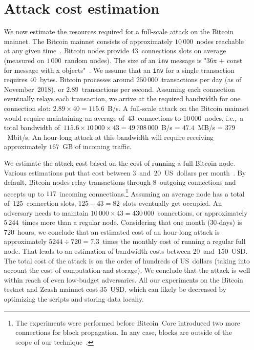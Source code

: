 \section{Attack cost estimation}

We now estimate the resources required for a full-scale attack on the Bitcoin mainnet.
The Bitcoin mainnet consists of approximately $10\,000$~nodes reachable at any given time~\cite{Bitnodes}.
Bitcoin nodes provide $43$~connections slots on average (measured on $1\,000$~random nodes).
The size of an \texttt{inv} message is "36x + const for message with x objects"~\cite{BitcoinWiki}.
We assume that an \texttt{inv} for a single transaction requires $40$~bytes.
Bitcoin processes around $250\,000$~transactions per day (as of November~2018), or $2.89$~transactions per second.
Assuming each connection eventually relays each transaction, we arrive at the required bandwidth for one connection slot: $2.89 \times 40 = 115.6$~B/s.
A full-scale attack on the Bitcoin mainnet would require maintaining an average of~$43$~connections to $10\,000$~nodes, i.e.,~a total bandwidth of~$115.6 \times 10\,000 \times 43 = 49\,708\,000$~B/s = $47.4$~MB/s = $379$~Mbit/s.
An hour-long attack at this bandwidth will require receiving approximately $167$~GB of incoming traffic.

We estimate the attack cost based on the cost of running a full Bitcoin node.
Various estimations put that cost between $3$~and~$20$~US~dollars per month~\cite{Zeyde2018, Connell2017}.
By default, Bitcoin nodes relay transactions through $8$~outgoing connections and accepts up to $117$~incoming connections.\footnote{The experiments were performed before Bitcoin~Core introduced two more connections for block propagation. In any case, blocks are outside of the scope of our technique~\cite{Daftuar2019}.}
Assuming an average node has a total of~$125$~connection slots, $125 - 43 = 82$~slots eventually get occupied.
An adversary needs to maintain $10\,000 \times 43 = 430\,000$~connections, or approximately $5\,244$~times more than a regular node.
Considering that one month ($30$-days) is $720$~hours, we conclude that an estimated cost of an hour-long attack is approximately $5244 \div 720 = 7.3$~times the monthly cost of running a regular full node.
That leads to an estimation of bandwidth costs between $20$~and~$150$~USD\@.
The total cost of the attack is on the order of hundreds of US~dollars (taking into account the cost of computation and storage).
We conclude that the attack is well within reach of even low-budget adversaries.
All our experiments on the Bitcoin testnet and Zcash mainnet cost $35$~USD, which can likely be decreased by optimizing the scripts and storing data locally.


